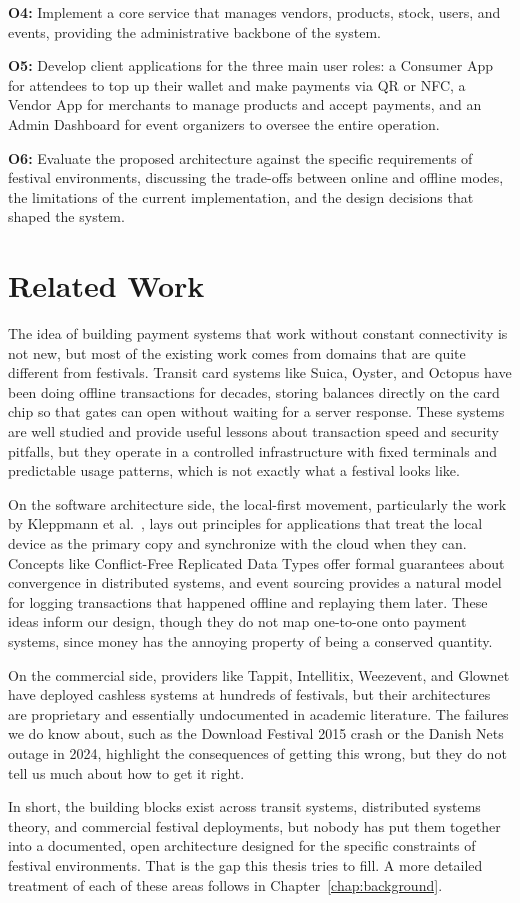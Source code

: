 \textbf{O4:} Implement a core service that manages vendors, products, stock, users, and events, providing the administrative backbone of the system.

\textbf{O5:} Develop client applications for the three main user roles: a Consumer App for attendees to top up their wallet and make payments via QR or NFC, a Vendor App for merchants to manage products and accept payments, and an Admin Dashboard for event organizers to oversee the entire operation.

\textbf{O6:} Evaluate the proposed architecture against the specific requirements of festival environments, discussing the trade-offs between online and offline modes, the limitations of the current implementation, and the design decisions that shaped the system.

\section{Related Work}
\label{sec:related-work}

The idea of building payment systems that work without constant connectivity is not new, but most of the existing work comes from domains that are quite different from festivals. Transit card systems like Suica, Oyster, and Octopus have been doing offline transactions for decades, storing balances directly on the card chip so that gates can open without waiting for a server response. These systems are well studied and provide useful lessons about transaction speed and security pitfalls, but they operate in a controlled infrastructure with fixed terminals and predictable usage patterns, which is not exactly what a festival looks like.

On the software architecture side, the local-first movement, particularly the work by Kleppmann et al.~\cite{Kleppmann2019}, lays out principles for applications that treat the local device as the primary copy and synchronize with the cloud when they can. Concepts like Conflict-Free Replicated Data Types offer formal guarantees about convergence in distributed systems, and event sourcing provides a natural model for logging transactions that happened offline and replaying them later. These ideas inform our design, though they do not map one-to-one onto payment systems, since money has the annoying property of being a conserved quantity.

On the commercial side, providers like Tappit, Intellitix, Weezevent, and Glownet have deployed cashless systems at hundreds of festivals, but their architectures are proprietary and essentially undocumented in academic literature. The failures we do know about, such as the Download Festival 2015 crash or the Danish Nets outage in 2024, highlight the consequences of getting this wrong, but they do not tell us much about how to get it right.

In short, the building blocks exist across transit systems, distributed systems theory, and commercial festival deployments, but nobody has put them together into a documented, open architecture designed for the specific constraints of festival environments. That is the gap this thesis tries to fill. A more detailed treatment of each of these areas follows in Chapter~\ref{chap:background}.
